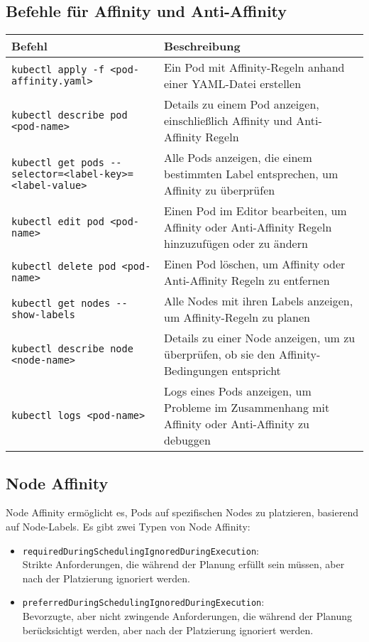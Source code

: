\subsection{Befehle für Affinity und Anti-Affinity}
\begin{tabular}{|p{}|p{}|}
\hline
\textbf{Befehl} & \textbf{Beschreibung} \\
\hline
\texttt{kubectl apply -f <pod-affinity.yaml>} & Ein Pod mit Affinity-Regeln anhand einer YAML-Datei erstellen \\
\texttt{kubectl describe pod <pod-name>} & Details zu einem Pod anzeigen, einschließlich Affinity und Anti-Affinity Regeln \\
\texttt{kubectl get pods {-}{-}selector=<label-key>=<label-value>} & Alle Pods anzeigen, die einem bestimmten Label entsprechen, um Affinity zu überprüfen \\
\texttt{kubectl edit pod <pod-name>} & Einen Pod im Editor bearbeiten, um Affinity oder Anti-Affinity Regeln hinzuzufügen oder zu ändern \\
\texttt{kubectl delete pod <pod-name>} & Einen Pod löschen, um Affinity oder Anti-Affinity Regeln zu entfernen \\
\texttt{kubectl get nodes {-}{-}show-labels} & Alle Nodes mit ihren Labels anzeigen, um Affinity-Regeln zu planen \\
\texttt{kubectl describe node <node-name>} & Details zu einer Node anzeigen, um zu überprüfen, ob sie den Affinity-Bedingungen entspricht \\
\texttt{kubectl logs <pod-name>} & Logs eines Pods anzeigen, um Probleme im Zusammenhang mit Affinity oder Anti-Affinity zu debuggen \\
\hline
\end{tabular}
\newpage
\subsection{Node Affinity}
Node Affinity ermöglicht es, Pods auf spezifischen Nodes zu platzieren, basierend auf Node-Labels. Es gibt zwei Typen von Node Affinity:
\begin{itemize}
    \item \texttt{requiredDuringSchedulingIgnoredDuringExecution}:\\
    Strikte Anforderungen, die während der Planung erfüllt sein müssen, aber nach der Platzierung ignoriert werden.
    \item \texttt{preferredDuringSchedulingIgnoredDuringExecution}:\\
    Bevorzugte, aber nicht zwingende Anforderungen, die während der Planung berücksichtigt werden, aber nach der Platzierung ignoriert werden.
\end{itemize}

